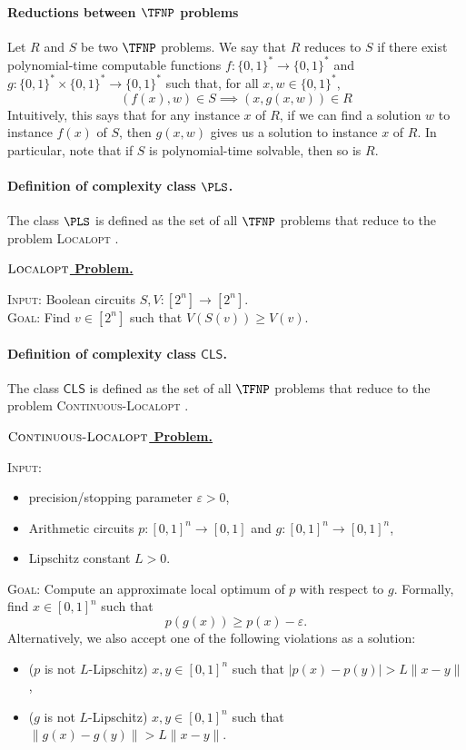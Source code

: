 \documentclass{article}
\theoremstyle{definition}  %
\theoremstyle{plain}
\numberwithin{observation}{section}
\numberwithin{claim}{section}
\numberwithin{fact}{section}
\numberwithin{lemma}{section}
\numberwithin{proposition}{section}
\numberwithin{theorem}{section}
\numberwithin{corollary}{section}
\numberwithin{definition}{section}
\newcommand{\CLS}{\mathsf{CLS}}
\newenvironment{nproblem}[1][\unskip]{%
  \medskip
  \begin{mdframed}
  \noindent
  \textbf{\underline{$#1$ Problem.}} \\
  \noindent
}{%
  \end{mdframed}
  \medskip %
}
\newcommand{\LOCALOPT}{\textsc{Localopt}}
\newcommand{\CONTLOCALOPT}{\textsc{Continuous-Localopt}}
\theoremstyle{plain}
\begin{document}
\paragraph{\bf Reductions between $\TFNP$ problems} Let $R$ and $S$ be two $\TFNP$ problems. We say that $R$ reduces to $S$ if there exist polynomial-time computable functions $f : \{0,1\}^* \to \{0,1\}^*$ and $g : \{0,1\}^* \times \{0,1\}^* \to \{0,1\}^*$ such that, for all $x,w \in \{0,1\}^*$,
$$(f(x), w) \in S \implies (x, g(x,w)) \in R$$
Intuitively, this says that for any instance $x$ of $R$, if we can find a solution $w$ to instance $f(x)$ of $S$, then $g(x,w)$ gives us a solution to instance $x$ of $R$. In particular, note that if $S$ is polynomial-time solvable, then so is $R$.

\paragraph{Definition of complexity class $\PLS$.} The class $\PLS$  is defined as the set of all $\TFNP$ problems that reduce to the problem \textsc{Localopt} \citep{johnson1988easy,daskalakis2011continuous}.

\begin{nproblem}[  \LOCALOPT]
\noindent\textsc{Input:} Boolean circuits $S,V : [2^n] \to [2^n].$\\
\noindent\textsc{Goal}: Find $v \in [2^n]$ such that $V(S(v)) \geq V(v)$.

\end{nproblem}


\paragraph{Definition of complexity class $\CLS$.} The class $\CLS$  is defined as the set of all $\TFNP$ problems that reduce to the problem \textsc{Continuous-Localopt} \citep{daskalakis2011continuous}.

\begin{nproblem}[  \CONTLOCALOPT]
\noindent\textsc{Input:} 
		\begin{itemize}
			\item precision/stopping parameter $\varepsilon > 0$,
			\item Arithmetic circuits $p: [0,1]^n \to [0,1]$ and $g: [0,1]^n \to [0,1]^n$,
			\item Lipschitz constant $L > 0$.
		\end{itemize}

\noindent\textsc{Goal}: Compute an approximate local optimum of $p$ with respect to $g$. Formally, find $x \in [0,1]^n$ such that
		$$p(g(x)) \geq p(x) - \varepsilon.$$
		Alternatively, we also accept one of the following violations as a solution:
		\begin{itemize}
			\item ($p$ is not $L$-Lipschitz) $x,y \in [0,1]^n$ such that $|p(x) - p(y)| > L \|x-y\|$,
			\item ($g$ is not $L$-Lipschitz) $x,y \in [0,1]^n$ such that $\|g(x) - g(y)\| > L \|x-y\|$.
		\end{itemize}

\end{nproblem}
\end{document}
